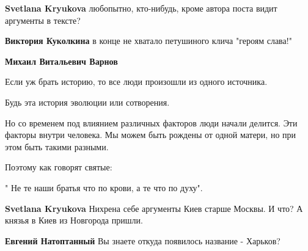 \begin{itemize}
\begin{itemize}
 
\textbf{Svetlana Kryukova} любопытно, кто-нибудь, кроме автора поста видит аргументы в тексте?

 
\textbf{Виктория Куколкина} в конце не хватало петушиного клича "героям слава!"

 
\textbf{Михаил Витальевич Варнов}

Если уж брать историю, то все люди произошли из одного источника.

Будь эта история эволюции или сотворения.

Но со временем под влиянием различных факторов люди начали делится. Эти факторы
внутри человека. Мы можем быть рождены от одной матери, но при этом быть такими
разными.

Поэтому как говорят святые:

" Не те наши братья что по крови, а те что по духу".

 
\textbf{Svetlana Kryukova} Нихрена себе аргументы Киев старше Москвы. И что? А князья в Киев из Новгорода пришли.

 
\textbf{Евгений Натоптанный} Вы знаете откуда появилось название - Харьков?

 

\end{itemize}
\end{itemize}
